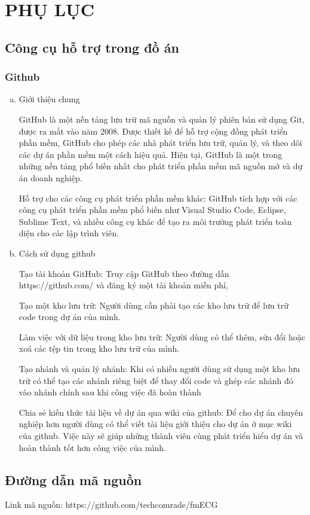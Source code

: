 
\section*{PHỤ LỤC}


\subsection*{Công cụ hỗ trợ trong đồ án}

\subsubsection*{Github}

\begin{enumerate}[a)]
  \item Giới thiệu chung
  
  GitHub là một nền tảng lưu trữ mã nguồn và quản lý phiên bản sử dụng Git, được ra mắt vào năm 2008. Được thiết kế để hỗ trợ cộng đồng phát triển phần mềm, GitHub cho phép các nhà phát triển lưu trữ, quản lý, và theo dõi các dự án phần mềm một cách hiệu quả. Hiện tại, GitHub là một trong những nền tảng phổ biến nhất cho phát triển phần mềm mã nguồn mở và dự án doanh nghiệp.
  

Hỗ trợ cho các công cụ phát triển phần mềm khác: GitHub tích hợp với các công cụ phát triển phần mềm phổ biến như Visual Studio Code, Eclipse, Sublime Text, và nhiều công cụ khác để tạo ra môi trường phát triển toàn diện cho các lập trình viên.



  \item Cách sử dụng github
  
  Tạo tài khoản GitHub: Truy cập GitHub theo đường dẫn https://github.com/ và đăng ký một tài khoản miễn phí, 

Tạo một kho lưu trữ: Người dùng cần phải tạo các kho lưu trữ để lưu trữ code trong dự án của mình.

Làm việc với dữ liệu trong kho lưu trữ: Người dùng có thể thêm, sửa đổi hoặc xoá các tệp tin trong kho lưu trữ của mình.

Tạo nhánh và quản lý nhánh: Khi có nhiều người dùng sử dụng một kho lưu trữ có thể tạo các nhánh riêng biệt để thay đổi code và ghép các nhánh đó vào nhánh chính sau khi công việc đã hoàn thành

Chia sẻ kiến thức tài liệu về dự án qua wiki của github: Để cho dự án chuyên nghiệp hơn người dùng có thể viết tài liệu giới thiệu cho dự án ở mục wiki của github. Việc này sẽ giúp những thành viên cùng phát triển hiểu dự án và hoàn thành tốt hơn công việc của mình.

\end{enumerate}

\subsection*{Đường dẫn mã nguồn}

Link mã nguồn: https://github.com/techcomrade/fmECG

\clearpage